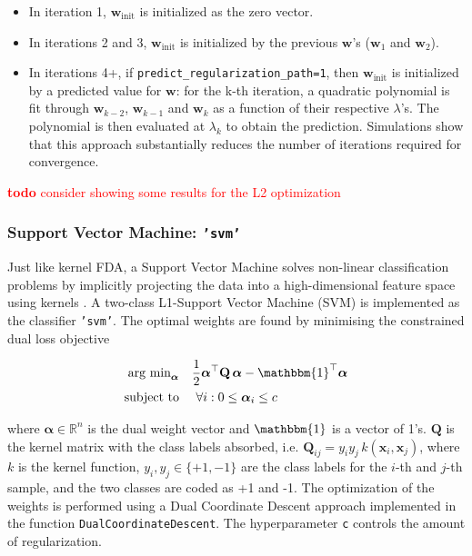 \documentclass[utf8]{frontiersSCNS} %
\newcommand{\al}{\boldsymbol{\alpha}}
\newcommand{\w}{\mathbf{w}}
\newcommand{\x}{\mathbf{x}}
\newcommand{\Q}{\mathbf{Q}}
\newcommand{\R}{\mathbb{R}}
\newcommand{\ttt}[1]{\texttt{#1}}
\newcommand{\todo}[1]{\textcolor{red}{\textbf{todo} #1}}
\begin{document}
\begin{itemize}
    \item In iteration 1, $\w_\text{init}$ is initialized as the zero vector.
    \item In iterations 2 and 3, $\w_\text{init}$ is initialized by the previous $\w$'s ($\w_1$ and $\w_2$).
    \item In iterations 4+, if \ttt{predict\_regularization\_path=1}, then $\w_\text{init}$ is initialized by a predicted value for $\w$: for the
  k-th iteration, a quadratic polynomial is fit through $\w_{k-2}$, $\w_{k-1}$ and $\w_k$ as a function of their respective $\lambda$'s. The polynomial is then evaluated at $\lambda_k$ to obtain the prediction. Simulations show that this approach substantially reduces the number of iterations required for convergence.
\end{itemize}{}

\todo{consider showing some results for the L2 optimization}


\subsubsection{Support Vector Machine: \ttt{'svm'}}

Just like kernel FDA, a Support Vector Machine solves non-linear classification problems by implicitly projecting the data into a high-dimensional feature space using kernels \citep{Bishop2007}.
A two-class L1-Support Vector Machine (SVM) is implemented as the classifier \ttt{'svm'}.
The optimal weights are found by minimising the constrained dual loss objective

\begin{align}
\begin{split}
\label{eq:svm_dual_loss_function}
\text{arg min}_{\al}\quad
& \frac{1}{2} \al^\top\Q\,\al - \mathbbm{1}^\top\al\\
\text{subject to}\quad  &\ \forall i: 0 \le \al_i \le c
\end{split}
\end{align}

where $\al\in\R^n$ is the dual weight vector and  $\mathbbm{1}$ is a vector of 1's. $\Q$ is the kernel matrix with the class labels absorbed, i.e. $\Q_{ij} = y_i y_j\, k(\x_i,\x_j)$, where $k$ is the kernel function, $y_i, y_j \in\{+1, -1\}$ are the class labels for the $i$-th and $j$-th sample, and the two classes are coded as +1 and -1. The optimization of the weights is performed using a Dual Coordinate Descent
approach  \citep{Hsieh2008ASVM} implemented in the function \ttt{DualCoordinateDescent}. The hyperparameter  \ttt{c} controls the amount of regularization.
\end{document}

